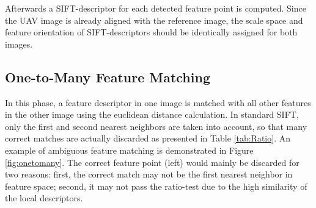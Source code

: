 
Afterwards a SIFT-descriptor for each detected feature point is computed. 
Since the UAV image is already aligned with the reference image, the scale space and feature orientation of SIFT-descriptors should be identically assigned for both images. 


\subsection{One-to-Many Feature Matching}\label{sec:Match}
In this phase, a feature descriptor in one image is matched with all other features in the other image using the euclidean distance calculation. 
In standard SIFT, only the first and second nearest neighbors are taken into account, so that many correct matches are actually discarded as presented in Table \ref{tab:Ratio}. 
An example of  ambiguous feature matching is demonstrated in Figure \ref{fig:onetomany}. 
The correct feature point (left) would mainly be discarded for two reasons: first, the correct match may not be the first nearest neighbor in feature space; second, it may not pass the ratio-test due to the high similarity of the local descriptors.  

